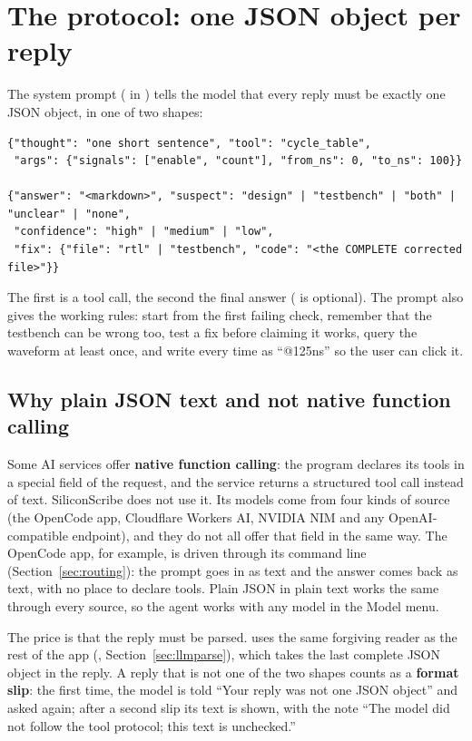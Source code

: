 \section{The protocol: one JSON object per reply}

The system prompt ( in ) tells the model that every reply must be exactly one JSON object, in one of two shapes:

\begin{lstlisting}[style=plain]
{"thought": "one short sentence", "tool": "cycle_table",
 "args": {"signals": ["enable", "count"], "from_ns": 0, "to_ns": 100}}

{"answer": "<markdown>", "suspect": "design" | "testbench" | "both" | "unclear" | "none",
 "confidence": "high" | "medium" | "low",
 "fix": {"file": "rtl" | "testbench", "code": "<the COMPLETE corrected file>"}}
\end{lstlisting}

The first is a tool call, the second the final answer ( is optional). The prompt also gives the working rules: start from the first failing check, remember that the testbench can be wrong too, test a fix before claiming it works, query the waveform at least once, and write every time as ``@125ns'' so the user can click it.

\subsection{Why plain JSON text and not native function calling}

Some AI services offer \textbf{native function calling}: the program declares its tools in a special field of the request, and the service returns a structured tool call instead of text. SiliconScribe does not use it. Its models come from four kinds of source (the OpenCode app, Cloudflare Workers AI, NVIDIA NIM and any OpenAI-compatible endpoint), and they do not all offer that field in the same way. The OpenCode app, for example, is driven through its command line (Section~\ref{sec:routing}): the prompt goes in as text and the answer comes back as text, with no place to declare tools. Plain JSON in plain text works the same through every source, so the agent works with any model in the Model menu.

The price is that the reply must be parsed.  uses the same forgiving reader as the rest of the app (, Section~\ref{sec:llmparse}), which takes the last complete JSON object in the reply. A reply that is not one of the two shapes counts as a \textbf{format slip}: the first time, the model is told ``Your reply was not one JSON object'' and asked again; after a second slip its text is shown, with the note ``The model did not follow the tool protocol; this text is unchecked.''

